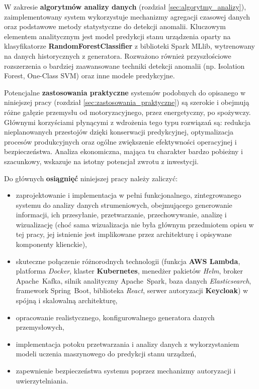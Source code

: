 W zakresie \textbf{algorytmów analizy danych} (rozdział \ref{sec:algorytmy_analizy}), zaimplementowany system wykorzystuje mechanizmy agregacji czasowej danych oraz podstawowe metody statystyczne do detekcji anomalii. Kluczowym elementem analitycznym jest model predykcji stanu urządzenia oparty na klasyfikatorze \textbf{RandomForestClassifier} z biblioteki Spark MLlib, wytrenowany na danych historycznych z generatora. Rozważono również przyszłościowe rozszerzenia o bardziej zaawansowane techniki detekcji anomalii (np. Isolation Forest, One-Class SVM) oraz inne modele predykcyjne.

Potencjalne \textbf{zastosowania praktyczne} systemów podobnych do opisanego w niniejszej pracy (rozdział \ref{sec:zastosowania_praktyczne}) są szerokie i obejmują różne gałęzie przemysłu od motoryzacyjnego, przez energetyczny, po spożywczy. Głównymi korzyściami płynącymi z wdrożenia tego typu rozwiązań są: redukcja nieplanowanych przestojów dzięki konserwacji predykcyjnej, optymalizacja procesów produkcyjnych oraz ogólne zwiększenie efektywności operacyjnej i bezpieczeństwa. Analiza ekonomiczna, mająca tu charakter bardzo pobieżny i szacunkowy, wskazuje na istotny potencjał zwrotu z inwestycji.

\vspace{0.3em}

Do głównych \textbf{osiągnięć} niniejszej pracy należy zaliczyć:
\begin{itemize}
    \item zaprojektowanie i implementacja w pełni funkcjonalnego, zintegrowanego systemu do analizy danych  strumeniowych, obejmującego generowanie informacji, ich przesyłanie, przetwarzanie, przechowywanie, analizę i wizualizację (choć sama wizualizacja nie była głównym przedmiotem opisu w tej pracy, jej istnienie jest implikowane przez architekturę i opisywane komponenty klienckie),
    \item skuteczne połączenie różnorodnych technologii (funkcja \textbf{AWS Lambda}, platforma \textit{Docker}, klaster \textbf{Kubernetes}, menedżer pakietów \textit{Helm}, broker \mbox{Apache Kafka}, silnik analityczny \mbox{Apache Spark}, baza danych \textit{Elasticsearch}, framework \mbox{Spring Boot}, biblioteka \textit{React}, serwer autoryzacji \textbf{Keycloak}) w spójną i skalowalną architekturę,
    \item opracowanie realistycznego, konfigurowalnego generatora danych przemysłowych,
    \item implementacja potoku przetwarzania i analizy danych z wykorzystaniem modeli uczenia maszynowego do predykcji stanu urządzeń,
    \item zapewnienie bezpieczeństwa systemu poprzez mechanizmy autoryzacji i uwierzytelniania.
\end{itemize}

